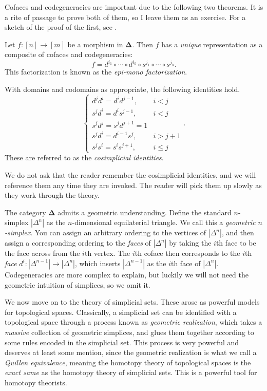 Cofaces and codegeneracies are important due to the following two theorems. It is a rite of passage to prove both of them, so I leave them as an exercise. For a sketch of the proof of the first, see \cite{ml}.

\begin{proposition}\label{3.4}
	Let $f : [n] \to [m]$ be a morphism in $\boldsymbol{\Delta} $. Then $f$ has a \emph{unique} representation as a composite of cofaces and codegeneracies:
	\[
		f=d^{i_1} \circ \cdots \circ d^{i_k} \circ s^{j_1} \circ \cdots \circ s^{j_h} 
	.\]
	This factorization is known as the \emph{epi-mono factorization}.
\end{proposition}
\begin{proposition}\label{3.5}
	With domains and codomains as appropriate, the following identities hold.
	\[
		\begin{cases}
			d^jd^i=d^id^{j-1} ,&i<j\\
			s^jd^i=d^is^{j-1} ,&i<j\\
			s^jd^j=s^jd^{j+1} =1&\\
			s^jd^i=d^{i-1} s^j,&i>j+1\\
			s^js^i=s^is^{j+1} ,&i\leq j
		\end{cases}
	.\]
	These are referred to as the \emph{cosimplicial identities}.
\end{proposition}

We do not ask that the reader remember the cosimplicial identities, and we will reference them any time they are invoked. The reader will pick them up slowly as they work through the theory.

The category $\boldsymbol{\Delta} $ admits a geometric understanding. Define the standard $n$-simplex $\left| \Delta ^n \right| $ as the $n$-dimensional equilaterial triangle. We call this a \emph{geometric $n$-simplex}. You can assign an arbitrary ordering to the vertices of $\left| \Delta ^n \right| $, and then assign a corresponding ordering to the \emph{faces} of $\left| \Delta ^n \right| $ by taking the $i$th face to be the face across from the $i$th vertex. The $i$th coface then corresponds to the $i$th \emph{face} $d^i : \left| \Delta ^{n-1}  \right|  \to \left| \Delta ^n \right| $, which inserts $\left| \Delta ^{n-1}  \right| $ as the $i$th face of $\left| \Delta ^n \right| $. Codegeneracies are more complex to explain, but luckily we will not need the geometric intuition of simplices, so we omit it.

We now move on to the theory of simplicial sets. These arose as powerful models for topological spaces. Classically, a simplicial set can be identified with a topological space through a process known as \emph{geometric realization}, which takes a \emph{massive} collection of geometric simplices, and glues them together according to some rules encoded in the simplicial set. This process is very powerful and deserves at least some mention, since the geometric realization is what we call a \emph{Quillen equivalence}, meaning the homotopy theory of topological spaces is the \emph{exact same} as the homotopy theory of simplicial sets. This is a powerful tool for homotopy theorists.

